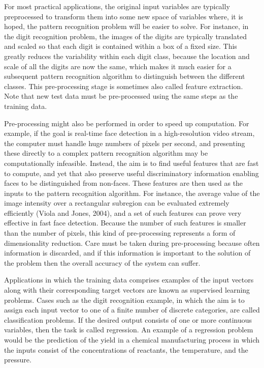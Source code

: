 \documentclass[
  10
]{article}
\begin{document}
For most practical applications, the original input variables are
typically preprocessed to transform them into some new space of
variables where, it is hoped, the pattern recognition problem will be
easier to solve. For instance, in the digit recognition problem, the
images of the digits are typically translated and scaled so that each
digit is contained within a box of a fixed size. This greatly reduces
the variability within each digit class, because the location and scale
of all the digits are now the same, which makes it much easier for a
subsequent pattern recognition algorithm to distinguish between the
different classes. This pre-processing stage is sometimes also called
feature extraction. Note that new test data must be pre-processed using
the same steps as the training data.

Pre-processing might also be performed in order to speed up computation.
For example, if the goal is real-time face detection in a
high-resolution video stream, the computer must handle huge numbers of
pixels per second, and presenting these directly to a complex pattern
recognition algorithm may be computationally infeasible. Instead, the
aim is to find useful features that are fast to compute, and yet that
also preserve useful discriminatory information enabling faces to be
distinguished from non-faces. These features are then used as the inputs
to the pattern recognition algorithm. For instance, the average value of
the image intensity over a rectangular subregion can be evaluated
extremely efficiently (Viola and Jones, 2004), and a set of such
features can prove very effective in fast face detection. Because the
number of such features is smaller than the number of pixels, this kind
of pre-processing represents a form of dimensionality reduction. Care
must be taken during pre-processing because often information is
discarded, and if this information is important to the solution of the
problem then the overall accuracy of the system can suffer.

Applications in which the training data comprises examples of the input
vectors along with their corresponding target vectors are known as
supervised learning problems. Cases such as the digit recognition
example, in which the aim is to assign each input vector to one of a
finite number of discrete categories, are called classification
problems. If the desired output consists of one or more continuous
variables, then the task is called regression. An example of a
regression problem would be the prediction of the yield in a chemical
manufacturing process in which the inputs consist of the concentrations
of reactants, the temperature, and the pressure.
\end{document}
